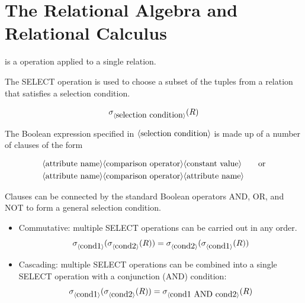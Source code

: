 \chapter{The Relational Algebra and Relational Calculus}

  \par {} is a operation applied to a single relation.

      \par The SELECT operation is used to choose a subset of the tuples from a relation that satisfies a selection condition.


      \begin{align*}
        \sigma_{\langle \mbox{selection condition} \rangle}(R)
      \end{align*}

      \par The Boolean expression specified in $\langle \mbox{selection condition} \rangle$ is made up of a number of clauses of the form

    \begin{align*}
      &\langle \mbox{attribute name} \rangle \langle \mbox{comparison operator} \rangle \langle \mbox{constant value} \rangle
      \qquad \mbox{or} \\
      &\langle \mbox{attribute name} \rangle \langle \mbox{comparison operator} \rangle \langle \mbox{attribute name} \rangle
    \end{align*}

    \par Clauses can be connected by the standard Boolean operators AND, OR, and NOT to form a general selection condition.

      \begin{itemize}
        \item Commutative: multiple SELECT operations can be carried out in any order.
          \begin{align}
            \sigma_{\langle \mbox{cond1} \rangle}(\sigma_{\langle \mbox{cond2} \rangle}(R)) =
            \sigma_{\langle \mbox{cond2} \rangle}(\sigma_{\langle \mbox{cond1} \rangle}(R))
          \end{align}
        \item Cascading: multiple SELECT operations can be combined into a single SELECT operation with a conjunction (AND) condition:
          \begin{align}
            \sigma_{\langle \mbox{cond1} \rangle}(\sigma_{\langle \mbox{cond2} \rangle}(R)) =
            \sigma_{\langle \mbox{cond1 AND cond2} \rangle}(R)
          \end{align}
      \end{itemize}

